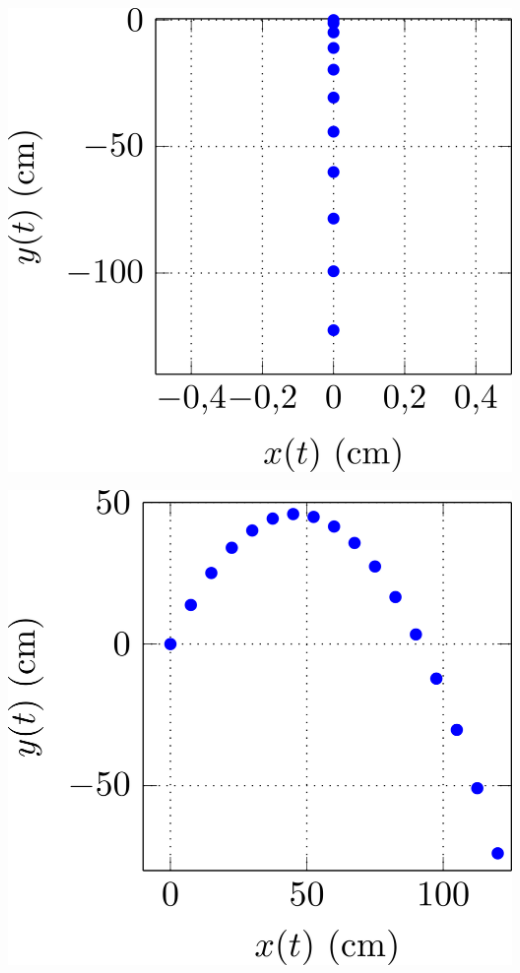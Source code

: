 \documentclass[../../main/main.tex]{subfiles}
\begin{document}
\begin{minipage}{0.31\linewidth}
	\begin{center}
		\includegraphics[width=\linewidth]{traj_nov}
	\end{center}
\end{minipage}
\hfill
\begin{minipage}{0.31\linewidth}
	\begin{center}
		\includegraphics[width=\linewidth]{traj_vo}
	\end{center}
\end{minipage}
\end{document}
